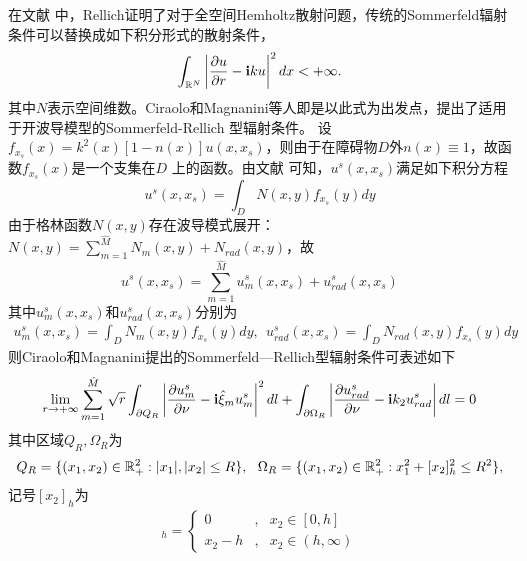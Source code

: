 在文献\cite{Rellich1943} 中，Rellich证明了对于全空间Hemholtz散射问题，传统的Sommerfeld辐射条件可以替换成如下积分形式的散射条件，
\begin{equation}\label{rellich_pri}
  \int_{\mathbb{R}^N}\left|\frac{\partial u}{\partial r}-\mathbf{i} k u\right|^2dx<+\infty.
\end{equation}
其中$N$表示空间维数。Ciraolo和Magnanini等人即是以此式为出发点，提出了适用于开波导模型的Sommerfeld-Rellich 型辐射条件。
设$f_{x_s}(x)=k^2(x)[1-n(x)]u(x,x_s)$，则由于在障碍物$D$外$n(x)\equiv1$，故函数$f_{x_s}(x)$是一个支集在$D$ 上的函数。由文献\cite{Ciraolo2009A1,Ciraolo2009A2,Dhia2009DIFFRACTION} 可知，$u^s(x,x_s)$满足如下积分方程
\begin{equation}\label{inte_sca_owg}
  u^s(x,x_s)=\int_DN(x,y)f_{x_s}(y)dy
\end{equation}
由于格林函数$N(x,y)$存在波导模式展开：$N(x,y)=\sum\limits_{m=1}^{\hat M}N_m(x,y)+N_{rad}(x,y)$，故
\begin{equation}
 u^s(x,x_s)=\sum\limits_{m=1}^{\hat M}u^s_m(x,x_s)+u^s_{rad}(x,x_s)
\end{equation}
其中$u^s_m(x,x_s)$和$u^s_{rad}(x,x_s)$分别为
\begin{eqnarray*}
  u^s_m(x,x_s)=\int_DN_m(x,y)f_{x_s}(y)dy,\ \  u^s_{rad}(x,x_s)=\int_DN_{rad}(x,y)f_{x_s}(y)dy
\end{eqnarray*}
则Ciraolo和Magnanini提出的Sommerfeld—Rellich型辐射条件可表述如下
\begin{equation}\label{Som_R2}
  \lim\limits_{r\rightarrow+\infty}\sum\limits_{m=1}^{\hat M}
  \sqrt{r}\int_{\partial Q_R}\left|\frac{\partial u^s_m}{\partial\nu}-\mathbf{i}\hat\xi_mu^s_m\right|^2dl
  +\int_{\partial\Omega_R}\left|\frac{\partial u^s_{rad}}{\partial\nu}-\mathbf{i} k_2u^s_{rad}\right|dl=0
\end{equation}
其中区域$Q_R,\Omega_R$为
\begin{equation*}
 Q_R=\{(x_1,x_2)\in\mathbb{R}^2_+:|x_1|,|x_2|\leq R\},\ \
 \Omega_R=\{(x_1,x_2)\in\mathbb{R}^2_+:x_1^2+[x_2]_h^2\leq R^2\},
\end{equation*}
记号$[x_2]_h$为
\begin{eqnarray*}
 [x_2]_h=\left\{
 \begin{array}{lll}
    0&,&x_2\in [0,h]\\
    x_2-h&,&x_2\in(h,\infty)
 \end{array}
 \right.
\end{eqnarray*}


